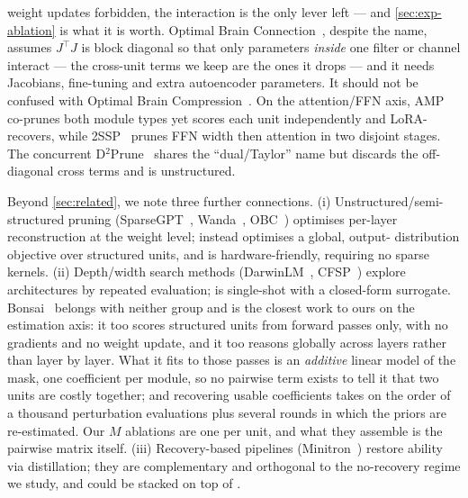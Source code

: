 weight updates forbidden, the interaction is the only lever left --- and \cref{sec:exp-ablation} is what
it is worth. Optimal Brain Connection~\citep{obc2025}, despite the name, assumes
$J^\top J$ is block diagonal so that only parameters \emph{inside} one filter or channel interact ---
the cross-unit terms we keep are the ones it drops --- and it needs Jacobians, fine-tuning and extra
autoencoder parameters. It should not be confused with Optimal Brain
Compression~\citep{frantar2022obc}. On the attention/FFN axis, AMP~\citep{sultan2025amp}
co-prunes both module types yet scores each unit independently and LoRA-recovers, while
2SSP~\citep{sandri2025twossp} prunes FFN width then attention in two disjoint stages. The concurrent
D$^2$Prune~\citep{xiong2026d2prune} shares the ``dual/Taylor'' name but discards the off-diagonal
cross terms and is unstructured.

Beyond \cref{sec:related}, we note three further connections. (i) Unstructured/semi-structured
pruning (SparseGPT~\citep{frantar2023sparsegpt}, Wanda~\citep{sun2024wanda}, OBC~\citep{frantar2022obc})
optimises per-layer reconstruction at the weight level; \method instead optimises a global, output-
distribution objective over structured units, and is hardware-friendly, requiring no sparse kernels.
(ii) Depth/width search methods (DarwinLM~\citep{tang2025darwinlm},
CFSP~\citep{gao2024cfsp}) explore architectures by repeated evaluation; \method is single-shot with a
closed-form surrogate. Bonsai~\citep{dery2024bonsai} belongs with neither group and is the closest work
to ours on the estimation axis: it too scores structured units from forward passes only, with no
gradients and no weight update, and it too reasons globally across layers rather than layer by layer.
What it fits to those passes is an \emph{additive} linear model of the mask, one coefficient per module,
so no pairwise term exists to tell it that two units are costly together; and recovering usable
coefficients takes on the order of a thousand perturbation evaluations plus several rounds in which the
priors are re-estimated. Our $M$ ablations are one per unit, and what they assemble is the pairwise
matrix itself. (iii) Recovery-based pipelines (Minitron~\citep{muralidharan2024minitron})
restore ability via distillation; they are complementary and orthogonal to the no-recovery regime we
study, and could be stacked on top of \method.

